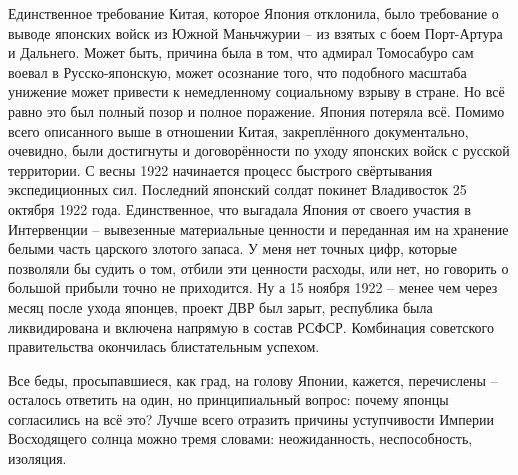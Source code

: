 Единственное требование Китая, которое Япония отклонила, было требование о выводе японских войск из Южной Маньчжурии – из взятых с боем Порт-Артура и Дальнего. Может быть, причина была в том, что адмирал Томосабуро сам воевал в Русско-японскую, может осознание того, что подобного масштаба унижение может привести к немедленному социальному взрыву в стране. Но всё равно это был полный позор и полное поражение. Япония потеряла всё. Помимо всего описанного выше в отношении Китая, закреплённого документально, очевидно, были достигнуты и договорённости по уходу японских войск с русской территории. С весны 1922 начинается процесс быстрого свёртывания экспедиционных сил. Последний японский солдат покинет Владивосток 25 октября 1922 года. Единственное, что выгадала Япония от своего участия в Интервенции – вывезенные материальные ценности и переданная им на хранение белыми часть царского злотого запаса. У меня нет точных цифр, которые позволяли бы судить о том, отбили эти ценности расходы, или нет, но говорить о большой прибыли точно не приходится. Ну а 15 ноября 1922 – менее чем через месяц после ухода японцев, проект ДВР был зарыт, республика была ликвидирована и включена напрямую в состав РСФСР. Комбинация советского правительства окончилась блистательным успехом.

Все беды, просыпавшиеся, как град, на голову Японии, кажется, перечислены – осталось ответить на один, но принципиальный вопрос: почему японцы согласились на всё это? Лучше всего отразить причины уступчивости Империи Восходящего солнца можно тремя словами: неожиданность, неспособность, изоляция.

